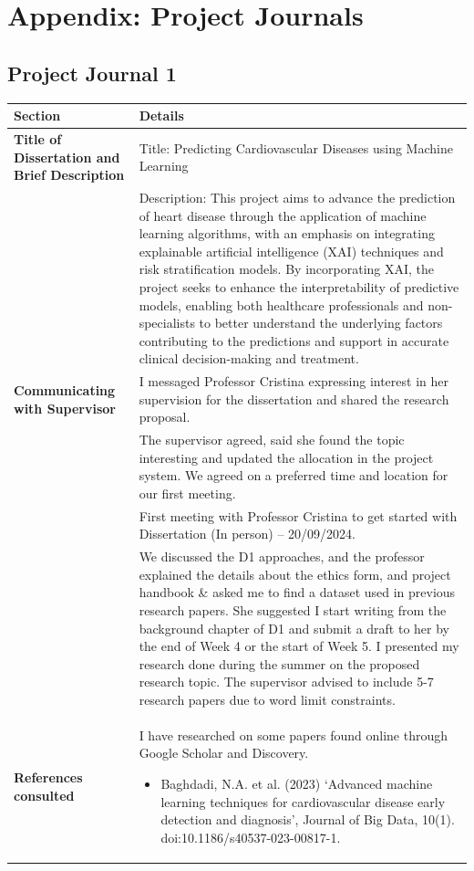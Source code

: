 \section{Appendix: Project Journals}
\subsection{Project Journal 1}

\begin{longtable}{|p{4cm}|p{11cm}|}
\hline
\textbf{Section} & \textbf{Details} \\
\hline
\textbf{Title of Dissertation and Brief Description} & 
Title: Predicting Cardiovascular Diseases using Machine Learning \\
& Description: This project aims to advance the prediction of heart disease through the application of machine learning algorithms, with an emphasis on integrating explainable artificial intelligence (XAI) techniques and risk stratification models. By incorporating XAI, the project seeks to enhance the interpretability of predictive models, enabling both healthcare professionals and non-specialists to better understand the underlying factors contributing to the predictions and support in accurate clinical decision-making and treatment. \\
\hline
\textbf{Communicating with Supervisor} & 
I messaged Professor Cristina expressing interest in her supervision for the dissertation and shared the research proposal. \\
& The supervisor agreed, said she found the topic interesting and updated the allocation in the project system. We agreed on a preferred time and location for our first meeting. \\
& First meeting with Professor Cristina to get started with Dissertation (In person) – 20/09/2024. \\
& We discussed the D1 approaches, and the professor explained the details about the ethics form, and project handbook \& asked me to find a dataset used in previous research papers. She suggested I start writing from the background chapter of D1 and submit a draft to her by the end of Week 4 or the start of Week 5. I presented my research done during the summer on the proposed research topic. The supervisor advised to include 5-7 research papers due to word limit constraints.  \\
\hline
\textbf{References consulted} &
I have researched on some papers found online through Google Scholar and Discovery. 
\begin{itemize}
    \item Baghdadi, N.A. et al. (2023) ‘Advanced machine learning techniques for cardiovascular disease early detection and diagnosis’, Journal of Big Data, 10(1). doi:10.1186/s40537-023-00817-1.
    

\end{itemize}
\end{longtable}
